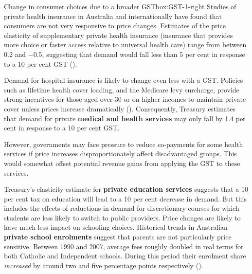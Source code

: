 {\begin{rultrabox}{Change in consumer choices due to a broader GST}{box:GST-1-right}
Studies of private health insurance in Australia and internationally have found that consumers are not very responsive to price changes. Estimates of the price elasticity of supplementary private health insurance (insurance that provides more choice or faster access relative to universal health care) range from between 0.2 and $-$0.5, suggesting that demand would fall less than 5 per cent in response to a 10 per cent GST (\textcite{Cheng2013-health-insurance-elasticity}). 

Demand for hospital insurance is likely to change even less with a GST\@. Policies such as lifetime health cover loading, and the Medicare levy surcharge, provide strong incentives for those aged over 30 or on higher incomes to maintain private cover unless prices increase dramatically (\textcite{ATO2015-Private-Health-Insurance-rebate-Medicare-levy-surcharge}). 
Consequently, Treasury estimates that demand for private \textbf{medical and health services} may only fall by 1.4 per cent in response to a 10 per cent GST. 

However, governments may face pressure to reduce co-payments for some health services if price increases disproportionately affect disadvantaged groups. This would somewhat offset potential revenue gains from applying the GST to these services. 

Treasury’s elasticity estimate for \textbf{private education services} suggests that a 10 per cent tax on education will lead to a 10 per cent decrease in demand. But this includes the effects of reductions in demand for discretionary courses for which students are less likely to switch to public providers. Price changes are likely to have much less impact on schooling choices. Historical trends in Australian \textbf{private school enrolments} suggest that parents are not particularly price sensitive. Between 1990 and 2007, average fees roughly doubled in real terms for both Catholic and Independent schools. During this period their enrolment share \emph{increased} by around two and five percentage points respectively (\textcite{NousGroup2011-Funding-for-Schooling}). 
\end{rultrabox}%
}



